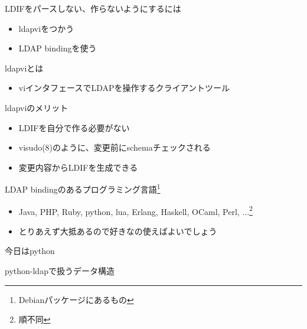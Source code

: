 \begin{frame}{LDIFをパースしない、作らないようにするには}
 \begin{itemize}
  \item ldapviをつかう
  \item LDAP bindingを使う
 \end{itemize}
\end{frame}

\begin{frame}{ldapviとは}
  \begin{itemize}
    \item viインタフェースでLDAPを操作するクライアントツール
  \end{itemize}
\end{frame}

\begin{frame}{ldapviのメリット}
  \begin{itemize}
    \item LDIFを自分で作る必要がない
    \item visudo(8)のように、変更前にschemaチェックされる
    \item 変更内容からLDIFを生成できる
  \end{itemize}
\end{frame}

\begin{frame}{LDAP bindingのあるプログラミング言語\footnote{Debianパッケージにあるもの}}
  \begin{itemize}
    \item Java, PHP, Ruby, python, lua, Erlang, Haskell, OCaml, Perl, ...\footnote{順不同}
    \item とりあえず大抵あるので好きなの使えばよいでしょう
  \end{itemize}
\end{frame}


\begin{frame}

{\Huge 今日はpython}

\end{frame}

\begin{frame}[containsverbatim]{python-ldapで扱うデータ構造}
  \begin{commandline}
  \end{commandline}
\end{frame}

